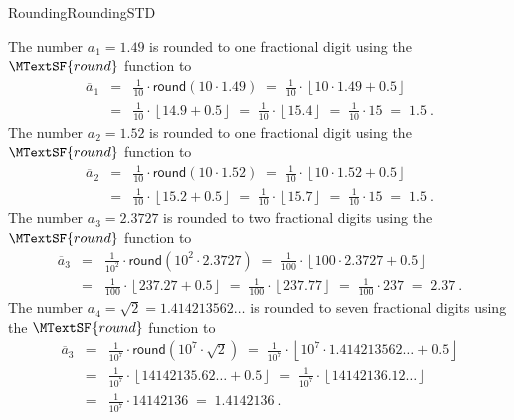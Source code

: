 \begin{MXContent}{Rounding}{Rounding}{STD}
\begin{MExample}
The number $a_{1}=1.49$ is rounded to one fractional digit using the $\MTextSF{round}$ function to
\begin{eqnarray*}
\overline{a}_1 & = & \frac{1}{10}\cdot \mathsf{round}(10 \cdot 1.49) \; =\; \frac{1}{10}\cdot \left\lfloor{10\cdot 1.49 + 0.5}\right\rfloor\\
&=& \frac{1}{10}\cdot \left\lfloor{14.9+0.5}\right\rfloor \;=\; \frac{1}{10}\cdot \left\lfloor{ 15.4 }\right\rfloor \;=\; \frac{1}{10}\cdot 15 \;=\; 1.5\: .
\end{eqnarray*}
The number $a_{2}=1.52$ is rounded to one fractional digit using the  $\MTextSF{round}$ function to
\begin{eqnarray*}
\overline{a}_{2}& = & \frac{1}{10}\cdot \mathsf{round}(10 \cdot 1.52)\; =\; \frac{1}{10}\cdot \left\lfloor{ 10\cdot 1.52 + 0.5 }\right\rfloor \\
& = & \frac{1}{10}\cdot \left\lfloor{ 15.2+0.5}\right\rfloor \;=\; \frac{1}{10}\cdot \left\lfloor{ 15.7 }\right\rfloor\; =\; \frac{1}{10}\cdot 15 \;=\; 1.5\: .
\end{eqnarray*}
The number $a_{3}=2.3727$ is rounded to two fractional digits using the  $\MTextSF{round}$ function to
\begin{eqnarray*}
\overline{a}_{3} & = & \frac{1}{10^{2}}\cdot \mathsf{round}(10^{2}\cdot 2.3727)\; =\; \frac{1}{100}\cdot \left\lfloor{ 100\cdot 2.3727 + 0.5 }\right\rfloor \\
& = & \frac{1}{100}\cdot \left\lfloor{ 237.27+0.5}\right\rfloor\; =\; \frac{1}{100}\cdot \left\lfloor{ 237.77 }\right\rfloor \; =\;  \frac{1}{100}\cdot 237\; =\; 2.37\: .
\end{eqnarray*}
The number  $a_{4}=\sqrt{2}=1.414213562\ldots$ is rounded to seven fractional digits using the  $\MTextSF{round}$ function to
\begin{eqnarray*}
\overline{a}_{3} & = & \frac{1}{10^{7}}\cdot \mathsf{round}(10^{7}\cdot \sqrt{2})\; =\; \frac{1}{10^{7}}\cdot \left\lfloor{ 10^{7}\cdot 1.414213562\ldots + 0.5 }\right\rfloor \\
& = & \frac{1}{10^{7}}\cdot \left\lfloor{ 14142135.62\ldots+0.5}\right\rfloor \;=\; \frac{1}{10^{7}}\cdot \left\lfloor{ 14142136.12\ldots }\right\rfloor \\
& = & \frac{1}{10^{7}}\cdot 14142136\; =\;  1.4142136\: .
\end{eqnarray*}
\end{MExample}


\end{MXContent}
